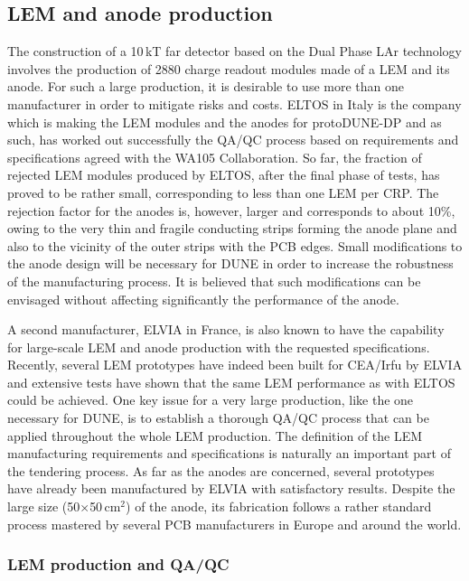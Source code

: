 \subsection{LEM and anode production}
\label{sec:fddp-crp-LASprod}
The construction of a 10\,kT far detector based on the Dual Phase LAr technology involves the production of 2880 charge readout modules made of a LEM and its anode. For such a large production, it is desirable to use more than one manufacturer in order to mitigate risks and costs. ELTOS in Italy is the company which is making the LEM modules and the anodes for protoDUNE-DP and as such, has worked out successfully the QA/QC process based on requirements and specifications agreed with the WA105 Collaboration. So far, the fraction of rejected LEM modules produced by ELTOS, after the final phase of tests, has proved to be rather small, corresponding to less than one LEM per CRP. The rejection factor for the anodes is, however, larger and corresponds to about 10\%, owing to the very thin and fragile conducting strips forming the anode plane and also to the vicinity of the outer strips with the PCB edges. Small modifications to the anode design will be necessary for DUNE in order to increase the robustness of the manufacturing process. It is believed that such modifications can be envisaged without affecting significantly the performance of the anode.   

A second manufacturer, ELVIA in France, is also known to have the capability for large-scale LEM and anode production with the requested specifications. Recently, several LEM prototypes have indeed been built for CEA/Irfu by ELVIA and extensive tests have shown that the same LEM performance as with ELTOS could be achieved. One key issue for a very large production, like the one necessary for DUNE, is to establish a thorough QA/QC process that can be applied throughout the whole LEM production. The definition of the LEM manufacturing requirements and specifications is naturally an important part of the tendering process. As far as the anodes are concerned, several prototypes have already been manufactured by ELVIA with satisfactory results. Despite the large size (50$\times$50\,cm$^2$) of the anode, its fabrication follows a rather standard process mastered by several PCB manufacturers in Europe and around the world.     

\subsubsection{LEM production and QA/QC}
\label{sec:fddp-crp-LEMprod}

